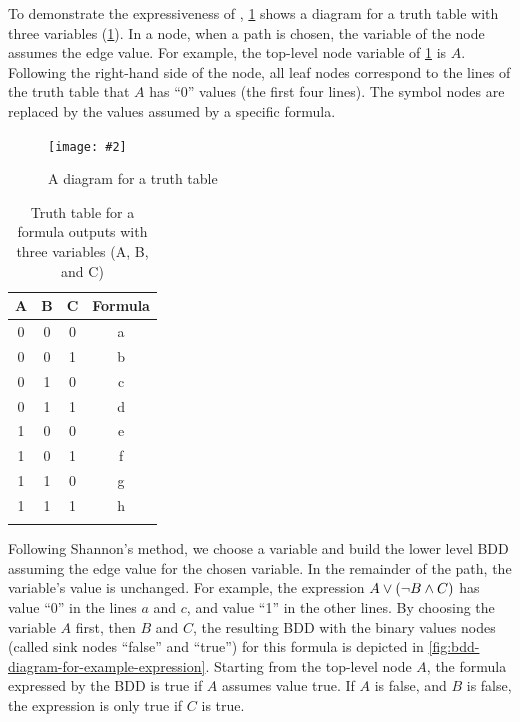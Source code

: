 \documentclass[12pt,openright,twoside,a4paper,oldfontcommands,english,brazil,final]{abntex2}
\theoremstyle{theo}
\newcommand{\includegraphicsaspectratio}[2][1]{%
  \texttt{[image: \#2]}%
}
\newcommand{\parsin}[1]{\ensuremath\left( #1 \right)}
\begin{document}
To demonstrate the expressiveness of , \cref{fig:bdd-diagram-for-a-truth-table} shows a diagram for a truth table with three variables (\cref{tbl:bdd-truth-table-with-three-variable}).
In a node, when a path is chosen, the variable of the node assumes the edge value.
For example, the top-level node variable of \cref{fig:bdd-diagram-for-a-truth-table} is $A$.
Following the right-hand side of the node, all leaf nodes correspond to the lines of the truth table that $A$ has ``0'' values (the first four lines).
The symbol nodes are replaced by the values assumed by a specific formula.

\begin{figure}[htb]
  \centering
  \includegraphicsaspectratio[0.5]{bdd-diagram-for-a-truth-table}
  \caption{A diagram for a truth table}
  \label{fig:bdd-diagram-for-a-truth-table}
\end{figure}

\begin{table}[t]
  \caption{Truth table for a formula outputs with three variables (A, B, and C)}
  \label{tbl:bdd-truth-table-with-three-variable}
  \centering
  {\footnotesize
  \begin{tabular}{cccc}
    \hline\noalign{\smallskip}
    \textbf{A} & \textbf{B} & \textbf{C} & \textbf{Formula}\\
    \hline\noalign{\smallskip}\hline\noalign{\smallskip}
    0 & 0 & 0 & a \\
    0 & 0 & 1 & b \\
    0 & 1 & 0 & c \\
    0 & 1 & 1 & d \\
    1 & 0 & 0 & e \\
    1 & 0 & 1 & f \\
    1 & 1 & 0 & g \\
    1 & 1 & 1 & h \\
    \hline\noalign{\smallskip}
  \end{tabular}
  }
\end{table}

Following Shannon's method, we choose a variable and build the lower level \ac{BDD} assuming the edge value for the chosen variable.
In the remainder of the path, the variable's value is unchanged.
For example, the expression $A \lor \parsin{\lnot B \land C}$ has value ``0'' in the lines $a$ and $c$, and value ``1'' in the other lines.
By choosing the variable $A$ first, then $B$ and $C$, the resulting \ac{BDD} with the binary values nodes (called sink nodes ``false'' and ``true'') for this formula is depicted in \cref{fig:bdd-diagram-for-example-expression}.
Starting from the top-level node $A$, the formula expressed by the \ac{BDD} is true if $A$ assumes value true.
If $A$ is false, and $B$ is false, the expression is only true if $C$ is true.
\end{document}
